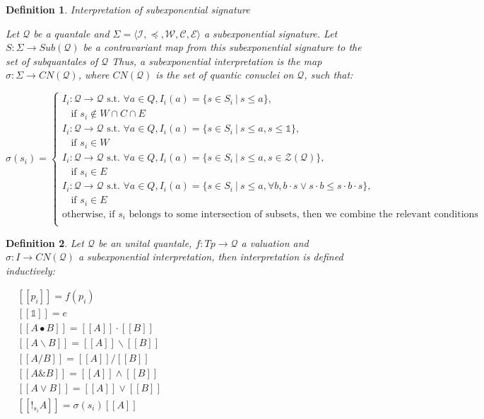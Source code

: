 \documentclass[a4paper]{article}
\theoremstyle{defin}
\newtheorem{defin}{Definition}
\theoremstyle{theorem}
\theoremstyle{prop}
\theoremstyle{lemma}
\theoremstyle{ex}
\theoremstyle{col}
\begin{document}
\begin{defin} Interpretation of subexponential signature

Let $\mathcal{Q}$ be a quantale and $\Sigma = \langle \mathcal{I}, \preceq, \mathcal{W}, \mathcal{C}, \mathcal{E} \rangle$
a subexponential signature. Let $S : \Sigma \to Sub(\mathcal{Q})$ be a contravariant map from this subexponential
signature to the set of subquantales of $\mathcal{Q}$ Thus, a subexponential interpretation is the map
$\sigma : \Sigma \to CN(\mathcal{Q})$, where $CN(\mathcal{Q})$ is the set of quantic conuclei on $\mathcal{Q}$, such that:

  $\sigma(s_i) = \begin{cases}
  I_i : \mathcal{Q} \to \mathcal{Q} \text{ s.t. } \forall a \in Q, I_i(a) = \{ s \in S_i \: | \: s \leq a\},
  \\ \:\:\:\: \text{if $s_i \notin W \cap C \cap E$} \\
  I_i : \mathcal{Q} \to \mathcal{Q} \text{ s.t. } \forall a \in Q, I_i(a) = \{ s \in S_i \: | \: s \leq a, s \leq \mathds{1}\},
  \\ \:\:\:\: \text{if $s_i \in W$} \\
  I_i : \mathcal{Q} \to \mathcal{Q} \text{ s.t. } \forall a \in Q, I_i(a) = \{ s \in S_i \: | \: s \leq a, s \in \mathcal{Z}(\mathcal{Q}) \},
  \\ \:\:\:\: \text{if $s_i \in E$} \\
  I_i : \mathcal{Q} \to \mathcal{Q} \text{ s.t. } \forall a \in Q, I_i(a) = \{ s \in S_i \: | \: s \leq a, \forall b, b \cdot s \vee s \cdot b \leq s \cdot b \cdot s \},
  \\ \:\:\:\: \text{if $s_i \in E$} \\
  \text{otherwise, if $s_i$ belongs to some intersection of subsets, then we combine the relevant conditions } \\
  \end{cases}$
\end{defin}

\begin{defin} Let $\mathcal{Q}$ be an unital quantale, $f : Tp \to \mathcal{Q}$ a valuation and $\sigma : I \to CN(\mathcal{Q})$ a subexponential interpretation, then interpretation is defined inductively:

\begin{center}
$\begin{array}{lll}
& [\![p_i]\!] = f(p_i)&\\
& [\![\mathds{1}]\!] = e & \\
&[\![A \bullet B]\!] = [\![A]\!] \cdot [\![B]\!] & \\
&[\![A \backslash B]\!] = [\![A]\!] \backslash [\![B]\!] & \\
&[\![A / B]\!] = [\![A]\!] / [\![B]\!]& \\
&[\![A \& B]\!] = [\![A]\!] \wedge [\![B]\!]& \\
&[\![A \vee B]\!] = [\![A]\!] \vee [\![B]\!]& \\
&[\![!_{s_i} A]\!] = \sigma(s_i) [\![A]\!]&
\end{array}$
\end{center}
\end{defin}
\end{document}
